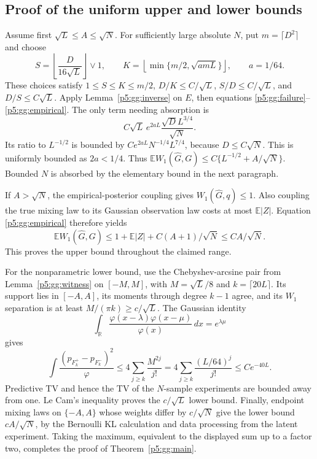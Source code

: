 \documentclass[11pt,a4paper]{article}
\theoremstyle{definition}
\theoremstyle{remark}
\numberwithin{equation}{section}
\begin{document}
\subsection{Proof of the uniform upper and lower bounds}

Assume first $\sqrt L\le A\le\sqrt N$.  For sufficiently large
absolute $N$, put $m=\lceil D^2\rceil$ and choose
\[
 S=\left\lfloor\frac D{16\sqrt L}\right\rfloor\vee1,
 \qquad
 K=\left\lfloor\min\{m/2,\sqrt{a mL}\}\right\rfloor,
 \qquad a=1/64.
\]
These choices satisfy $1\le S\le K\le m/2$,
$D/K\le C/\sqrt L$, $S/D\le C/\sqrt L$, and
$D/S\le C\sqrt L$.  Apply Lemma~\ref{p5:gg:inverse} on $E$,
then equations \eqref{p5:gg:failure}--\eqref{p5:gg:empirical}.  The
only term needing absorption is
\[
 C\sqrt L\,e^{2aL}\frac{\sqrt D L^{3/4}}{\sqrt N}.
\]
Its ratio to $L^{-1/2}$ is bounded by
$Ce^{2aL}N^{-1/4}L^{7/4}$, because $D\le C\sqrt N$.
This is uniformly bounded as $2a<1/4$.  Thus
$\mathbb EW_1(\widehat G,G)\le C\{L^{-1/2}+A/\sqrt N\}$.
Bounded $N$ is absorbed by the elementary bound in the next paragraph.

If $A>\sqrt N$, the empirical-posterior coupling gives
$W_1(\widehat G,q)\le1$.  Also coupling the true mixing law to
its Gaussian observation law costs at most $\mathbb E|Z|$.
Equation \eqref{p5:gg:empirical} therefore yields
\[
 \mathbb E W_1(\widehat G,G)
             \le1+\mathbb E|Z|+C(A+1)/\sqrt N
             \le CA/\sqrt N.
\]
This proves the upper bound throughout the claimed range.

For the nonparametric lower bound, use the Chebyshev-arcsine pair
from Lemma~\ref{p5:gg:witness} on $[-M,M]$, with
$M=\sqrt L/8$ and $k=\lceil20L\rceil$.  Its support lies in
$[-A,A]$, its moments through degree $k-1$ agree, and its
$W_1$ separation is at least $M/(\pi k)\ge c/\sqrt L$.
The Gaussian identity
\[
 \int_{\mathbb R}\frac{\varphi(x-\lambda)\varphi(x-\mu)}
                         {\varphi(x)}\,dx=e^{\lambda\mu}
\]
gives
\[
 \int\frac{(p_{F_k^+}-p_{F_k^-})^2}{\varphi}
           \le4\sum_{j\ge k}\frac{M^{2j}}{j!}
           =4\sum_{j\ge k}\frac{(L/64)^j}{j!}
           \le Ce^{-40L}.
\]
Predictive TV and hence the TV of the $N$-sample experiments are
bounded away from one.  Le Cam's inequality proves the
$c/\sqrt L$ lower bound.  Finally, endpoint mixing laws on
$\{-A,A\}$ whose weights differ by $c/\sqrt N$ give the lower
bound $cA/\sqrt N$, by the Bernoulli KL calculation and data
processing from the latent experiment.  Taking the maximum,
equivalent to the displayed sum up to a factor two, completes
the proof of Theorem~\ref{p5:gg:main}.
\end{document}
